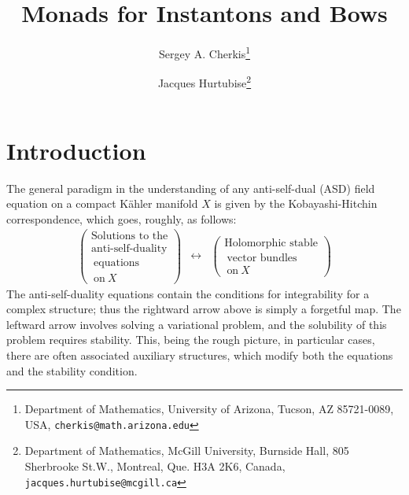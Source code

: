 \documentclass[12pt]{article}
\theoremstyle{definition}
\theoremstyle{remark}
\numberwithin{theorem}{section}
\begin{document}
\title{Monads for Instantons and Bows}

\author{Sergey A. Cherkis\thanks{
Department of Mathematics, University of Arizona, 
Tucson, AZ 85721-0089, USA, 
\tt cherkis@math.arizona.edu}
\and
Jacques Hurtubise\thanks{
Department of Mathematics,
McGill University,
Burnside Hall,
805 Sherbrooke St.W.,
Montreal, Que. H3A 2K6,
Canada,
\tt jacques.hurtubise@mcgill.ca}}
\date{}
\maketitle


  \newpage\tableofcontents\newpage
 
\section{Introduction} 
The general paradigm in the understanding of any anti-self-dual (ASD)  field equation  on a compact K\"ahler manifold $X$ is given by the Kobayashi-Hitchin correspondence, which goes, roughly, as follows:
$$\begin{matrix} \begin{pmatrix} {\text{Solutions to the}}\\ {\text{anti-self-duality}}\\ \ \text{equations}\\ \ \text{on}\ X \end{pmatrix} & \leftrightarrow & \begin{pmatrix} \text{Holomorphic stable}\\ \ \text{vector bundles} \\ \ \text{on}\ X  \end{pmatrix}\end{matrix}$$
The anti-self-duality equations contain the conditions for integrability for a complex structure; thus the rightward arrow above is simply a forgetful map. The leftward arrow involves solving a variational problem, and the solubility of this problem requires stability. This, being the rough picture, in particular cases, there are often associated auxiliary structures, which modify both the equations and the stability condition.
\end{document}
